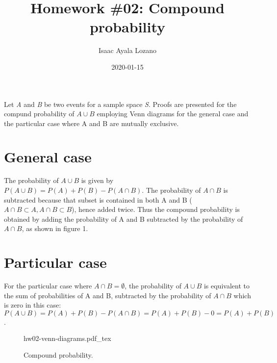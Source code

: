 \documentclass[a4paper,12pt]{article}
\title{Homework \#02: Compound probability}
\author{Isaac Ayala Lozano}
\date{2020-01-15}
\begin{document}
\maketitle

\def\firstcircle{(0,0) circle (1.5cm)}
\def\secondcircle{(0:2cm) circle (1.5cm)}
\def\thirdcircle{(45:2cm) circle (1.5cm)}

Let \emph A and \emph B be two events for a sample space \emph{S}. Proofs are presented for the compund probability of $A \cup B$ employing Venn diagrams for the general case and the particular case where A and B are mutually exclusive.

\section{General case}

The probability of $A \cup B$ is given by  $P(A \cup B) = P(A) + P(B) - P(A \cap B)$. 
The probability of $A \cap B$ is subtracted because that subset is contained in both A and B ($A \cap B \subset A,  A \cap B \subset B$), hence added twice.
Thus the compound probability is obtained by adding the probability of A and B subtracted by the probability of $A \cap B$, as shown in figure 1.


\section{Particular case}

For the particular case where $A \cap B = \emptyset$, the probability of $A \cup B$ is equivalent to the sum of probabilities of A and B, subtracted by the probability of $A \cap B$ which is zero in this case:
$P(A \cup B) = P(A) + P(B) - P(A \cap B) = P(A) + P(B) - 0 = P (A) + P (B)$.


 \begin{figure}[ht]
    \centering
    {hw02-venn-diagrams.pdf_tex}
    \caption{Compound probability.}
    \label{fig: compound probability}
\end{figure}
\end{document}

